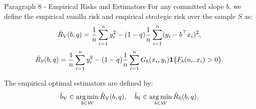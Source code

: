 \begin{faqblock}
\faqanswers
{}
\end{faqblock}

\begin{sourceblock}{Paragraph 8 - Empirical Risks and Estimators}
For any committed slope $b$, we define the empirical vanilla risk and empirical strategic risk over the sample $S$ as:
\begin{equation}
    \label{eq:empirical_vanilla_risk}
    \hat{R}_{\mathrm{V}}(b, q) = \frac{1}{n}\sum_{i=1}^n y_i^2 - (1 - q)\frac{1}{n}\sum_{i=1}^n (y_i - b^\top x_i)^2,
\end{equation}
\begin{equation}
    \label{eq:empirical_strategic_risk}
    \hat{R}_{\mathrm{S}}(b, q) = \frac{1}{n}\sum_{i=1}^n y_i^2 - (1 - q)\frac{1}{n}\sum_{i=1}^n G_b(x_i, y_i) \mathbf{1}\{F_b(u_i, x_i) > 0\}.
\end{equation}

The empirical optimal estimators are defined by:
\begin{equation}
    \label{eq:empirical_estimators}
    \hat{b}_{\mathrm{V}} \in \operatorname*{arg\,min}_{b \in \mathcal{W}} \hat{R}_{\mathrm{V}}(b, q), \quad \hat{b}_{\mathrm{S}} \in \operatorname*{arg\,min}_{b \in \mathcal{W}} \hat{R}_{\mathrm{S}}(b, q).
\end{equation}
\end{sourceblock}

\begin{faqblock}
\faqanswers
{}
\end{faqblock}

